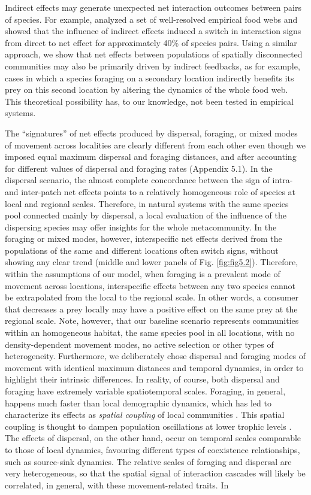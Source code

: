 Indirect effects may generate unexpected net interaction outcomes between pairs of species. For example, \cite{Montoya2009a} analyzed a set of well-resolved empirical food webs and showed that the influence of indirect effects induced a switch in interaction signs from direct to net effect for approximately 40\% of species pairs. Using a similar approach, we show that net effects between populations of spatially disconnected communities may also be primarily driven by indirect feedbacks, as for example, cases in which a species foraging on a secondary location indirectly benefits its prey on this second location by altering the dynamics of the whole food web. This theoretical possibility has, to our knowledge, not been tested in empirical systems.

The ``signatures'' of net effects produced by dispersal, foraging, or mixed modes of movement across localities are clearly different from each other \citep{Amarasekare2008} even though we imposed equal maximum dispersal and foraging distances, and after accounting for different values of dispersal and foraging rates (Appendix 5.1). In the dispersal scenario, the almost complete concordance between the sign of intra- and inter-patch net effects points to a relatively homogeneous role of species at local and regional scales. Therefore, in natural systems with the same species pool connected mainly by dispersal, a local evaluation of the influence of the dispersing species may offer insights for the whole metacommunity. In the foraging or mixed modes, however, interspecific net effects derived from the populations of the same and different locations often switch signs, without showing any clear trend (middle and lower panels of Fig. \ref{fig:fig5.2}). Therefore, within the assumptions of our model, when foraging is a prevalent mode of movement across locations, interspecific effects between any two species cannot be extrapolated from the local to the regional scale. In other words, a consumer that decreases a prey locally may have a positive effect on the same prey at the regional scale. Note, however, that our baseline scenario represents communities within an homogeneous habitat, the same species pool in all locations, with no density-dependent movement modes, no active selection or other types of heterogeneity. Furthermore, we deliberately chose dispersal and foraging modes of movement with identical maximum distances and temporal dynamics, in order to highlight their intrinsic differences. In reality, of course, both dispersal and foraging have extremely variable spatiotemporal scales. Foraging, in general, happens much faster than local demographic dynamics, which has led to characterize its effects as \textit{spatial coupling} of local communities \citep{Massol2011}. This spatial coupling is thought to dampen population oscillations at lower trophic levels \citep{McCann2005}. The effects of dispersal, on the other hand, occur on temporal scales comparable to those of local dynamics, favouring different types of coexistence relationships, such as source-sink dynamics. The relative scales of foraging and dispersal are very heterogeneous, so that the spatial signal of interaction cascades will likely be correlated, in general, with these movement-related traits. In 